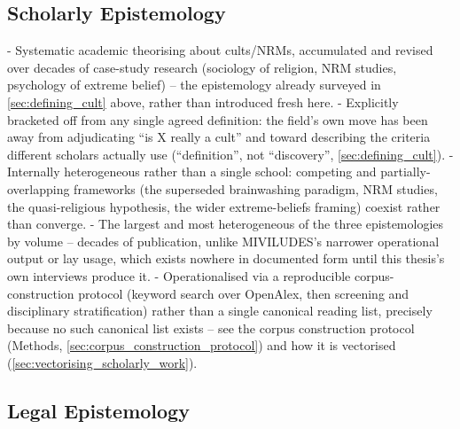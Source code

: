 \subsection{Scholarly Epistemology}
- Systematic academic theorising about cults/NRMs, accumulated and revised over decades of case-study research (sociology of religion, NRM studies, psychology of extreme belief) -- the epistemology already surveyed in \ref{sec:defining_cult} above, rather than introduced fresh here.
- Explicitly bracketed off from any single agreed definition: the field's own move has been away from adjudicating \enquote{is X really a cult} and toward describing the criteria different scholars actually use (\enquote{definition}, not \enquote{discovery}, \ref{sec:defining_cult}).
- Internally heterogeneous rather than a single school: competing and partially-overlapping frameworks (the superseded brainwashing paradigm, NRM studies, the quasi-religious hypothesis, the wider extreme-beliefs framing) coexist rather than converge.
- The largest and most heterogeneous of the three epistemologies by volume -- decades of publication, unlike MIVILUDES's narrower operational output or lay usage, which exists nowhere in documented form until this thesis's own interviews produce it.
- Operationalised via a reproducible corpus-construction protocol (keyword search over OpenAlex, then screening and disciplinary stratification) rather than a single canonical reading list, precisely because no such canonical list exists -- see the corpus construction protocol (Methods, \ref{sec:corpus_construction_protocol}) and how it is vectorised (\ref{sec:vectorising_scholarly_work}).

\subsection{Legal Epistemology}

